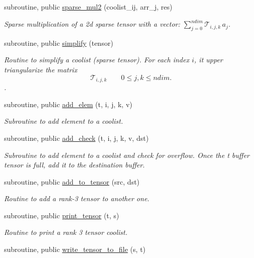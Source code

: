 \begin{DoxyCompactItemize}
subroutine, public \hyperlink{namespacetensor_a70230d57c615d9548905bc023f5fc01d}{sparse\+\_\+mul2} (coolist\+\_\+ij, arr\+\_\+j, res)
\begin{DoxyCompactList}\small\item\em Sparse multiplication of a 2d sparse tensor with a vector\+: ${\displaystyle \sum_{j=0}^{ndim}} \mathcal{T}_{i,j,k} \, a_j $. \end{DoxyCompactList}\item 
subroutine, public \hyperlink{namespacetensor_a364522b80ab0f4785c331eb74fa1ba04}{simplify} (tensor)
\begin{DoxyCompactList}\small\item\em Routine to simplify a coolist (sparse tensor). For each index $i$, it upper triangularize the matrix \[\mathcal{T}_{i,j,k} \qquad 0 \leq j,k \leq ndim.\]. \end{DoxyCompactList}\item 
subroutine, public \hyperlink{namespacetensor_a7f144457b3535357ab582fc3ff0da3a0}{add\+\_\+elem} (t, i, j, k, v)
\begin{DoxyCompactList}\small\item\em Subroutine to add element to a coolist. \end{DoxyCompactList}\item 
subroutine, public \hyperlink{namespacetensor_ac86b7b23b35e64127e04b31d7cfc7ae9}{add\+\_\+check} (t, i, j, k, v, dst)
\begin{DoxyCompactList}\small\item\em Subroutine to add element to a coolist and check for overflow. Once the t buffer tensor is full, add it to the destination buffer. \end{DoxyCompactList}\item 
subroutine, public \hyperlink{namespacetensor_aad7cd55f3a4cec4676cc7ca34b05f1a8}{add\+\_\+to\+\_\+tensor} (src, dst)
\begin{DoxyCompactList}\small\item\em Routine to add a rank-\/3 tensor to another one. \end{DoxyCompactList}\item 
subroutine, public \hyperlink{namespacetensor_a1fbaf180beb7fe8ab83ade2f576db80f}{print\+\_\+tensor} (t, s)
\begin{DoxyCompactList}\small\item\em Routine to print a rank 3 tensor coolist. \end{DoxyCompactList}\item 
subroutine, public \hyperlink{namespacetensor_ab9cef88cb38333ed2c063cdf08f28060}{write\+\_\+tensor\+\_\+to\+\_\+file} (s, t)

\end{DoxyCompactItemize}
